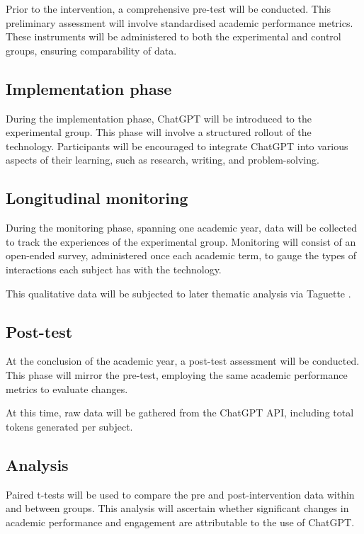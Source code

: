 \documentclass[12pt]{article}
\begin{document}
Prior to the intervention, a comprehensive pre-test will be conducted. This preliminary assessment will involve standardised academic performance metrics. These instruments will be administered to both the experimental and control groups, ensuring comparability of data.

\subsection{Implementation phase}

During the implementation phase, ChatGPT will be introduced to the experimental group. This phase will involve a structured rollout of the technology. Participants will be encouraged to integrate ChatGPT into various aspects of their learning, such as research, writing, and problem-solving. 

\subsection{Longitudinal monitoring }

During the monitoring phase, spanning one academic year, data will be collected to track the experiences of the experimental group. Monitoring will consist of an open-ended survey, administered once each academic term, to gauge the types of interactions each subject has with the technology.

This qualitative data will be subjected to later thematic analysis via Taguette \cite{taguette}.

\subsection{Post-test}

At the conclusion of the academic year, a post-test assessment will be conducted. This phase will mirror the pre-test, employing the same academic performance metrics to evaluate changes. 

At this time, raw data will be gathered from the ChatGPT API, including total tokens generated per subject.

\subsection{Analysis}
 
Paired t-tests will be used to compare the pre and post-intervention data within and between groups. This analysis will ascertain whether significant changes in academic performance and engagement are attributable to the use of ChatGPT. 
\end{document}
